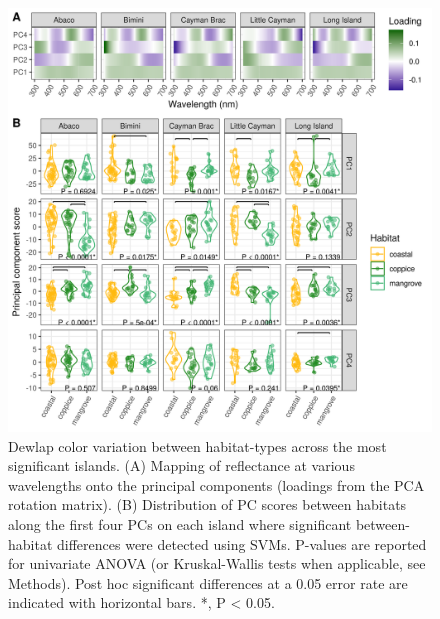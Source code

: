 \begin{figure}
	\centering
	\includegraphics[width=\textwidth]{figures/figure_anova.png}
	\caption{Dewlap color variation between habitat-types across the most significant islands. (A) Mapping of reflectance at various wavelengths onto the principal components (loadings from the PCA rotation matrix). (B) Distribution of PC scores between habitats along the first four PCs on each island where significant between-habitat differences were detected using SVMs. P-values are reported for univariate ANOVA (or Kruskal-Wallis tests when applicable, see Methods). Post hoc significant differences at a 0.05 error rate are indicated with horizontal bars. *, P < 0.05.}
	\label{fig:anova}
\end{figure}

